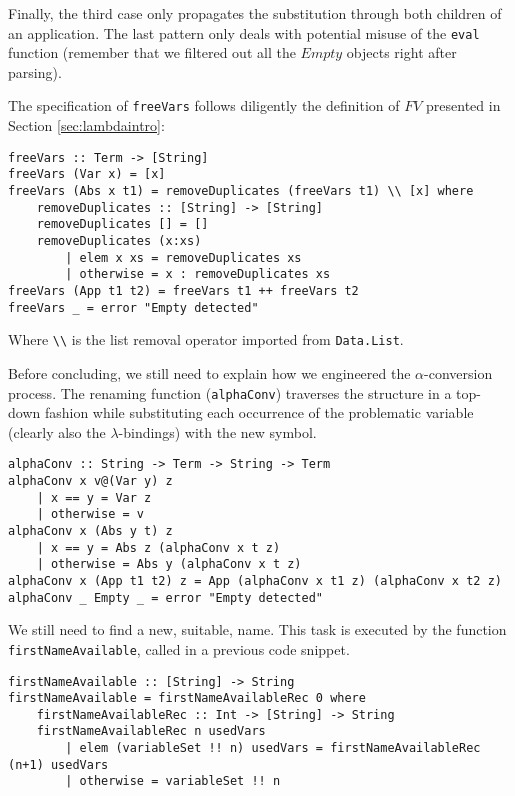 \documentclass{article}
\begin{document}
Finally, the third case only propagates the substitution through both children of an application. The last pattern only deals with potential misuse of the \lstinline|eval| function (remember that we filtered out all the $Empty$ objects right after parsing).

The specification of \lstinline|freeVars| follows diligently the definition of $FV$ presented in Section \ref{sec:lambdaintro}:

\begin{lstlisting}
freeVars :: Term -> [String]
freeVars (Var x) = [x]
freeVars (Abs x t1) = removeDuplicates (freeVars t1) \\ [x] where
    removeDuplicates :: [String] -> [String]
    removeDuplicates [] = []
    removeDuplicates (x:xs)
        | elem x xs = removeDuplicates xs
        | otherwise = x : removeDuplicates xs
freeVars (App t1 t2) = freeVars t1 ++ freeVars t2
freeVars _ = error "Empty detected"
\end{lstlisting}

Where \lstinline|\\| is the list removal operator imported from \lstinline|Data.List|.

Before concluding, we still need to explain how we engineered the $\alpha$-conversion process. The renaming function (\lstinline|alphaConv|) traverses the structure in a top-down fashion while substituting each occurrence of the problematic variable (clearly also the $\lambda$-bindings) with the new symbol.

\begin{lstlisting}
alphaConv :: String -> Term -> String -> Term
alphaConv x v@(Var y) z
    | x == y = Var z
    | otherwise = v
alphaConv x (Abs y t) z
    | x == y = Abs z (alphaConv x t z)
    | otherwise = Abs y (alphaConv x t z)
alphaConv x (App t1 t2) z = App (alphaConv x t1 z) (alphaConv x t2 z)
alphaConv _ Empty _ = error "Empty detected"
\end{lstlisting}

We still need to find a new, suitable, name. This task is executed by the function \lstinline|firstNameAvailable|, called in a previous code snippet.

\begin{lstlisting}
firstNameAvailable :: [String] -> String
firstNameAvailable = firstNameAvailableRec 0 where
    firstNameAvailableRec :: Int -> [String] -> String
    firstNameAvailableRec n usedVars
        | elem (variableSet !! n) usedVars = firstNameAvailableRec (n+1) usedVars
        | otherwise = variableSet !! n
\end{lstlisting}
\end{document}
